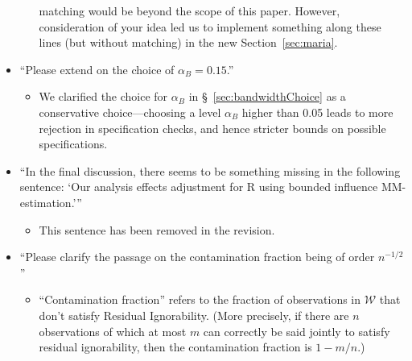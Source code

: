 \documentclass[12pt]{article}
\begin{document}
\begin{itemize}
\begin{itemize}
     matching would be beyond the scope of this paper.  However,
     consideration of your idea led us to implement
     something along these lines (but without matching) in the new 
     Section~\ref{sec:maria}.
  \end{itemize}
\item ``Please extend on the choice of $\alpha_B=0.15$.''
\begin{itemize}
 \item We clarified the choice for $\alpha_B$ in
   \S~\ref{sec:bandwidthChoice} as a
   conservative choice---choosing a level $\alpha_B$ higher than 0.05
   leads to more rejection in specification checks, and hence stricter
   bounds on possible specifications.
\end{itemize}
\item ``In the final discussion, there seems to be something missing in
  the following sentence: `Our analysis effects adjustment for R using
  bounded influence MM- estimation.'''
\begin{itemize}
\item This sentence has been removed in the revision.
\end{itemize}
\item ``Please clarify the passage on the contamination fraction being of
order $n^{-1/2}$''
\begin{itemize}
 \item ``Contamination fraction'' 
   refers to the fraction of
   observations in $\mathcal{W}$ that don't satisfy Residual
   Ignorability.   (More precisely, if  there are $n$ observations of
   which at most $m$ can correctly be said jointly to satisfy residual
   ignorability, then the contamination fraction is $1-m/n$.)  


\end{itemize}
\end{itemize}
\end{document}
